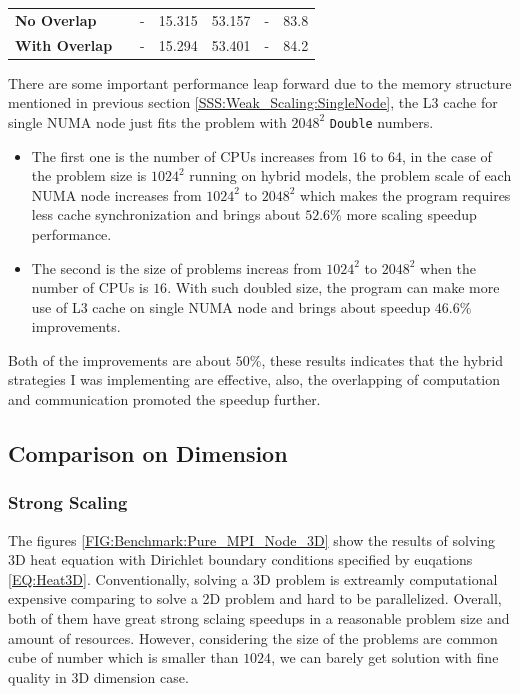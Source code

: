 \begin{table}[htbp]
\begin{minipage}{\columnwidth}
\begin{center}
\begin{tabular}{>{\bfseries}p{3cm} p{1.5cm} p{1.5cm} p{1.5cm} p{1.5cm} p{1.5cm} p{1cm}}
        No Overlap    &                               &   -    & 15.315  & 53.157   &   -                                        & 83.8 \\
        With Overlap  &                               &   -    & 15.294  & 53.401   &   -                                        & 84.2 \\
        \bottomrule
      \end{tabular}
    \end{center}
  \end{minipage}
\end{table}

There are some important performance leap forward 
due to the memory structure mentioned in previous section \ref{SSS:Weak_Scaling:SingleNode}, the L3 cache for single NUMA node 
just fits the problem with $2048^2$ \texttt{Double} numbers.
\begin{itemize}
  \item The first one is the number of CPUs increases from $16$ to $64$, in the case of the problem size is $1024^2$ running on hybrid models, 
  the problem scale of each NUMA node increases from $1024^2$ to $2048^2$ which makes the program requires less cache synchronization 
  and brings about $52.6\%$ more scaling speedup performance.
  \item The second is the size of problems increas from $1024^2$ to $2048^2$ when the number of CPUs is $16$.
  With such doubled size, the program can make more use of L3 cache on single NUMA node and brings about speedup $46.6\%$ improvements. 
\end{itemize}
Both of the improvements are about $50\%$, these results indicates that the hybrid strategies I was implementing are effective, 
also, the overlapping of computation and communication promoted the 
speedup further.

\subsection{Comparison on Dimension}
\subsubsection{Strong Scaling}
The figures \ref{FIG:Benchmark:Pure_MPI_Node_3D} show the results of solving 3D heat equation with Dirichlet boundary conditions 
specified by euqations \ref{EQ:Heat3D}.
Conventionally, solving a 3D problem is extreamly computational expensive comparing to solve a 2D problem and hard to be parallelized.
Overall, both of them have great strong sclaing speedups in a reasonable problem size and amount of resources.
However, considering the size of the problems are common cube of number which is smaller than $1024$, 
we can barely get solution with fine quality in 3D dimension case.

